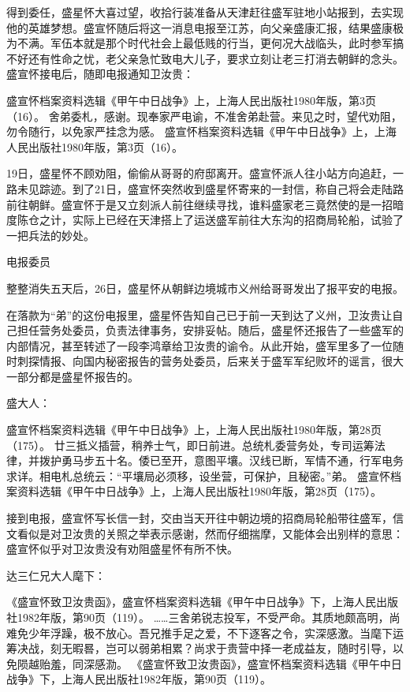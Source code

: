 \documentclass[12pt,UTF8]{ctexbook}
\begin{document}
得到委任，盛星怀大喜过望，收拾行装准备从天津赶往盛军驻地小站报到，去实现他的英雄梦想。盛宣怀随后将这一消息电报至江苏，向父亲盛康汇报，结果盛康极为不满。军伍本就是那个时代社会上最低贱的行当，更何况大战临头，此时参军搞不好还有性命之忧，老父亲急忙致电大儿子，要求立刻让老三打消去朝鲜的念头。盛宣怀接电后，随即电报通知卫汝贵：

盛宣怀档案资料选辑《甲午中日战争》上，上海人民出版社1980年版，第3页（16）。
舍弟委札，感谢。现奉家严电谕，不准舍弟赴营。来见之时，望代劝阻，勿令随行，以免家严挂念为感。 盛宣怀档案资料选辑《甲午中日战争》上，上海人民出版社1980年版，第3页（16）。

19日，盛星怀不顾劝阻，偷偷从哥哥的府邸离开。盛宣怀派人往小站方向追赶，一路未见踪迹。到了21日，盛宣怀突然收到盛星怀寄来的一封信，称自己将会走陆路前往朝鲜。盛宣怀于是又立刻派人前往继续寻找，谁料盛家老三竟然使的是一招暗度陈仓之计，实际上已经在天津搭上了运送盛军前往大东沟的招商局轮船，试验了一把兵法的妙处。

电报委员

整整消失五天后，26日，盛星怀从朝鲜边境城市义州给哥哥发出了报平安的电报。

在落款为“弟”的这份电报里，盛星怀告知自己已于前一天到达了义州，卫汝贵让自己担任营务处委员，负责法律事务，安排妥帖。随后，盛星怀还报告了一些盛军的内部情况，甚至转述了一段李鸿章给卫汝贵的谕令。从此开始，盛军里多了一位随时刺探情报、向国内秘密报告的营务处委员，后来关于盛军军纪败坏的谣言，很大一部分都是盛星怀报告的。

盛大人：

盛宣怀档案资料选辑《甲午中日战争》上，上海人民出版社1980年版，第28页（175）。
廿三抵义插营，稍养士气，即日前进。总统札委营务处，专司运筹法律，并拨护勇马步五十名。倭已至开，意图平壤。汉线已断，军情不通，行军电务求详。相电札总统云：“平壤局必须移，设坐营，可保护，且秘密。”弟。 盛宣怀档案资料选辑《甲午中日战争》上，上海人民出版社1980年版，第28页（175）。

接到电报，盛宣怀写长信一封，交由当天开往中朝边境的招商局轮船带往盛军，信文看似是对卫汝贵的关照之举表示感谢，然而仔细揣摩，又能体会出别样的意思：盛宣怀似乎对卫汝贵没有劝阻盛星怀有所不快。

达三仁兄大人麾下：

《盛宣怀致卫汝贵函》，盛宣怀档案资料选辑《甲午中日战争》下，上海人民出版社1982年版，第90页（119）。
……三舍弟锐志投军，不受严命。其质地颇高明，尚难免少年浮躁，极不放心。吾兄推手足之爱，不下逐客之令，实深感激。当麾下运筹决战，刻无暇晷，岂可以弱弟相累？尚求于贵营中择一老成益友，随时引导，以免陨越贻羞，同深感泐。 《盛宣怀致卫汝贵函》，盛宣怀档案资料选辑《甲午中日战争》下，上海人民出版社1982年版，第90页（119）。
\end{document}
